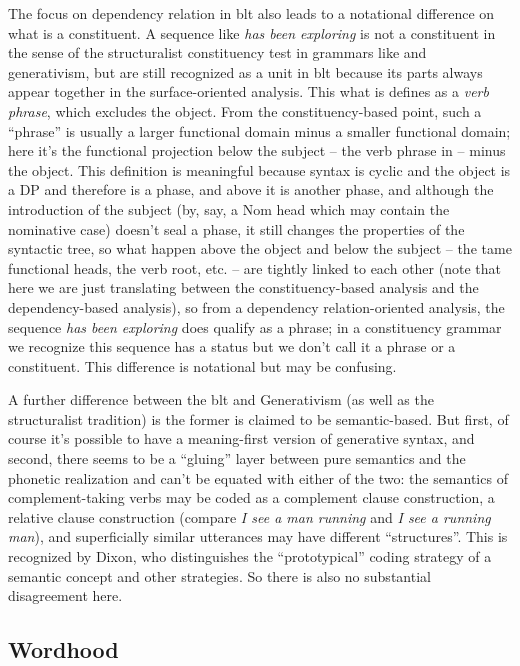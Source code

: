 \documentclass[UTF8, a4paper, oneside, scheme=plain, 12pt]{ctexrep}
\newcommand*{\citepage}[1]{p.~{#1}}
\newcommand*{\term}[1]{\emph{#1}}
\newcommand{\form}[1]{\emph{#1}}
\begin{document}
{The focus on dependency relation in \acs{blt} also leads to 
a notational difference on what is a constituent.
A sequence like \form{has been exploring} is not a constituent in the sense of 
the structuralist constituency test in grammars like \citet{cgel} and generativism,
but are still recognized as a unit in \acs{blt} 
because its parts always appear together in the surface-oriented analysis.
This what is \citet[\citepage{109}]{dixon2009basic} defines 
as a \term{verb phrase},
which excludes the object. 
From the constituency-based point, 
such a ``phrase'' is usually a larger functional domain minus a smaller functional domain;
here it's the functional projection below the subject -- the verb phrase in \citet{cgel} --
minus the object.
This definition is meaningful 
because syntax is cyclic 
and the object is a DP and therefore is a phase, 
and above it is another phase, 
and although the introduction of the subject 
(by, say, a Nom head which may contain the nominative case) 
doesn't seal a phase, 
it still changes the properties of the syntactic tree, 
so what happen above the object and below the subject 
-- the \acs{tame} functional heads, the verb root, etc. -- 
are tightly linked to each other
(note that here we are just translating between 
the constituency-based analysis and the dependency-based analysis), 
so from a dependency relation-oriented analysis, 
the sequence \form{has been exploring} does qualify as a phrase; 
in a constituency grammar 
we recognize this sequence has a status 
but we don't call it a phrase or a constituent.
This difference is notational but may be confusing.

A further difference between the \acl{blt} and Generativism (as well as the structuralist tradition)
is the former is claimed to be semantic-based.
But first, of course it's possible to have a meaning-first version of generative syntax,
and second,
there seems to be a ``gluing'' layer between pure semantics and 
the phonetic realization 
and can't be equated with either of the two: 
the semantics of complement-taking verbs 
may be coded as a complement clause construction, 
a relative clause construction 
(compare \form{I see a man running} and \form{I see a running man}),
and superficially similar utterances may have different ``structures''.
This is recognized by Dixon, 
who distinguishes the ``prototypical'' coding strategy of a semantic concept 
and other strategies.
So there is also no substantial disagreement here.

\subsection{Wordhood}\label{sec:theory.word}

}
\end{document}
